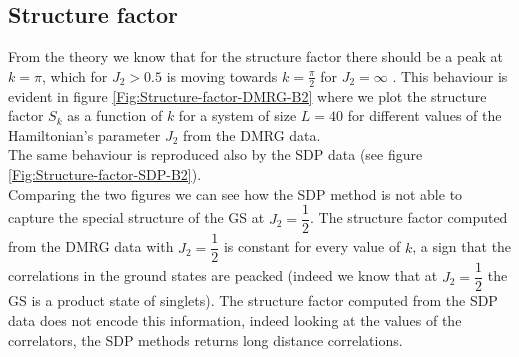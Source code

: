 \documentclass[10pt,a4paper,twoside,twocolumn]{revtex4-1}
\begin{document}
\subsection{Structure factor}
From the theory we know that for the structure factor there should be a peak at $k=\pi$, which for $J_2>0.5$ is moving towards $k=\frac{\pi}{2}$ for $J_2 = \infty $ \cite{chitra1995}.
This behaviour is evident in figure \ref{Fig:Structure-factor-DMRG-B2} where we plot the structure factor $S_{k}$ as a function of $k$ for a system of size $L=40$ for different values of the Hamiltonian's parameter $J_2$ from the DMRG data. \\
The same behaviour is reproduced also by the SDP data (see figure \ref{Fig:Structure-factor-SDP-B2}). \\

Comparing the two figures we can see how the SDP method is not able to capture the special structure of the GS at $J_2=\dfrac{1}{2}$. The structure factor computed from the DMRG data with $J_2=\dfrac{1}{2}$ is constant for every value of $k$,  a sign that the correlations in the ground states are peacked (indeed we know that at $J_2=\dfrac{1}{2}$ the GS is a product state of singlets). The structure factor computed from the SDP data does not encode this information, indeed looking at the values of the correlators, the SDP methods returns long distance correlations.
\end{document}
